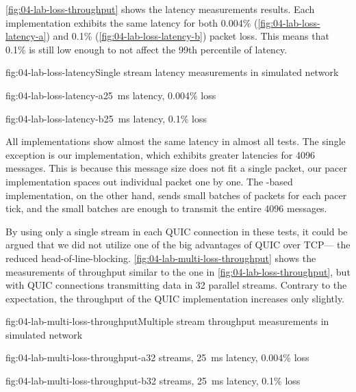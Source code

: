 \autoref{fig:04-lab-loss-throughput} shows the latency measurements results. Each implementation
exhibits the same latency for both 0.004\% (\autoref{fig:04-lab-loss-latency-a}) and 0.1\%
(\autoref{fig:04-lab-loss-latency-b}) packet loss. This means that 0.1\% is still low enough to not
affect the 99th percentile of latency.

\begin{myFigure}{fig:04-lab-loss-latency}{Single stream latency measurements in simulated network}
\begin{mySubfigure}{0.49\linewidth}{fig:04-lab-loss-latency-a}{\SI{25}{\milli\second} latency, 0.004\% loss}
\footnotesize

\end{mySubfigure}
\begin{mySubfigure}{0.49\linewidth}{fig:04-lab-loss-latency-b}{\SI{25}{\milli\second} latency, 0.1\% loss}
\footnotesize

\end{mySubfigure}
\end{myFigure}

All implementations show almost the same latency in almost all tests. The single exception is our
implementation, which exhibits greater latencies for \SI{4096}{\byte} messages. This is because this
message size does not fit a single packet, our pacer implementation spaces out individual packet one
by one. The \libmsquic{}-based implementation, on the other hand, sends small batches of packets for
each pacer tick, and the small batches are enough to transmit the entire \SI{4096}{\byte} messages.

By using only a single stream in each QUIC connection in these tests, it could be argued that we did
not utilize one of the big advantages of QUIC over TCP\@ --- the reduced \gls{head-of-line-blocking}.
\autoref{fig:04-lab-multi-loss-throughput} shows the measurements of throughput similar to the one
in \autoref{fig:04-lab-loss-throughput}, but with QUIC connections transmitting data in 32 parallel
streams. Contrary to the expectation, the throughput of the QUIC implementation increases only
slightly.

\begin{myFigure}{fig:04-lab-multi-loss-throughput}{Multiple stream throughput measurements in simulated network}
\begin{mySubfigure}{0.49\linewidth}{fig:04-lab-multi-loss-throughput-a}{32 streams, \SI{25}{\milli\second} latency, 0.004\% loss}
\footnotesize

\end{mySubfigure}
\begin{mySubfigure}{0.49\linewidth}{fig:04-lab-multi-loss-throughput-b}{32 streams, \SI{25}{\milli\second} latency, 0.1\% loss}
\footnotesize

\end{mySubfigure}
\end{myFigure}

